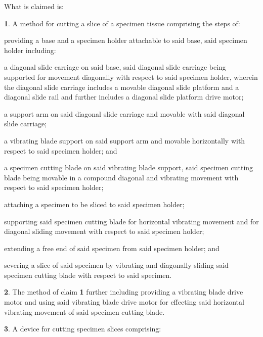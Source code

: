 \documentclass{article}
\begin{document}
\noindent What is claimed is:
\begin{hangpars}

\textbf{1}. A method for cutting a slice of a specimen tissue comprising the steps of:

\hspace*{1.5em}providing a base and a specimen holder attachable to said base, said specimen holder including:

\hspace*{1.5em}a diagonal slide carriage on said base, said diagonal slide carriage being supported for movement diagonally with respect to said specimen holder, wherein the diagonal slide carriage includes a movable diagonal slide platform and a diagonal slide rail and further includes a diagonal slide platform drive motor;

\hspace*{1.5em}a support arm on said diagonal slide carriage and movable with said diagonal slide carriage;

\hspace*{1.5em}a vibrating blade support on said support arm and movable horizontally with respect to said specimen holder; and

\hspace*{1.5em}a specimen cutting blade on said vibrating blade support, said specimen cutting blade being movable in a compound diagonal and vibrating movement with respect to said specimen holder;

\hspace*{1.5em}attaching a specimen to be sliced to said specimen holder;

\hspace*{1.5em}supporting said specimen cutting blade for horizontal vibrating movement and for diagonal sliding movement with respect to said specimen holder;

\hspace*{1.5em}extending a free end of said specimen from said specimen holder; and

\hspace*{1.5em}severing a slice of said specimen by vibrating and diagonally sliding said specimen cutting blade with respect to said specimen.

\textbf{2}. The method of claim \textbf{1} further including providing a vibrating blade drive motor and using said vibrating blade drive motor for effecting said horizontal vibrating movement of said specimen cutting blade.

\textbf{3}. A device for cutting specimen slices comprising:


\end{hangpars}
\end{document}

